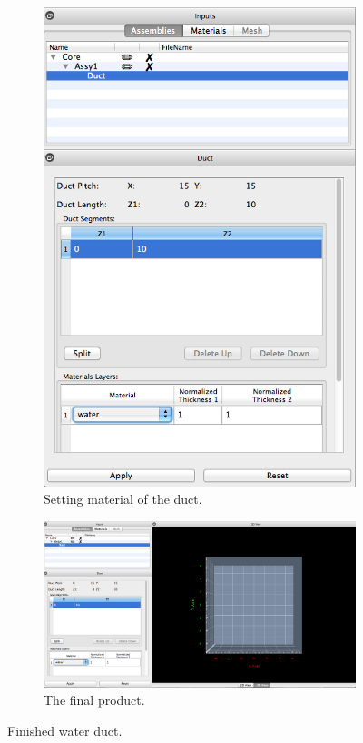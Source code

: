 \begin{figure}
\centering
\begin{subfigure}{.5\textwidth}
  \centering
  \includegraphics[width=0.7\linewidth]{Images/rect-set-material.png}
  \caption{Setting material of the duct.}
  \label{fig:rectSetMaterial}
\end{subfigure}%
\begin{subfigure}{.5\textwidth}
  \centering
  \includegraphics[width=0.9\linewidth]{Images/rect-duct-result.png}
  \caption{The final product.}
  \label{fig:rectDuctResult}
\end{subfigure}
\caption{Finished water duct.}
\label{fig:test}
\end{figure}

